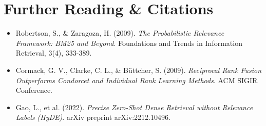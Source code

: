\section{Further Reading \& Citations}
\begin{itemize}[leftmargin=18pt]
  \item Robertson, S., \& Zaragoza, H. (2009). \emph{The Probabilistic Relevance Framework: BM25 and Beyond}. Foundations and Trends in Information Retrieval, 3(4), 333-389.
  \item Cormack, G. V., Clarke, C. L., \& Büttcher, S. (2009). \emph{Reciprocal Rank Fusion Outperforms Condorcet and Individual Rank Learning Methods}. ACM SIGIR Conference.
  \item Gao, L., et al. (2022). \emph{Precise Zero-Shot Dense Retrieval without Relevance Labels (HyDE)}. arXiv preprint arXiv:2212.10496.
\end{itemize}
